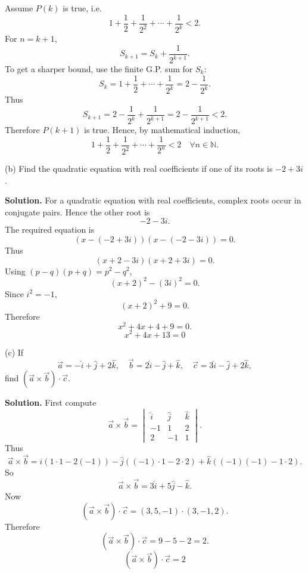 \documentclass[11pt,a4paper]{article}
\newcommand{\question}[1]{\vspace{0.4em}\begin{tcolorbox}[colback=gray!8,colframe=black!55,title=Question,fonttitle=\bfseries]#1\end{tcolorbox}}
\newcommand{\answer}{\textbf{Solution. }}
\newcommand{\final}[1]{\[\boxed{#1}\]}
\newcommand{\N}{\mathbb{N}}
\begin{document}
Assume $P(k)$ is true, i.e.
\[
1+\frac12+\frac1{2^2}+\cdots+\frac1{2^k}<2.
\]
For $n=k+1$,
\[
S_{k+1}=S_k+\frac1{2^{k+1}}.
\]
To get a sharper bound, use the finite G.P. sum for $S_k$:
\[
S_k=1+\frac12+\cdots+\frac1{2^k}=2-\frac1{2^k}.
\]
Thus
\[
S_{k+1}=2-\frac1{2^k}+\frac1{2^{k+1}}
=2-\frac1{2^{k+1}}<2.
\]
Therefore $P(k+1)$ is true. Hence, by mathematical induction,
\[
\boxed{1+\frac12+\frac1{2^2}+\cdots+\frac1{2^n}<2\quad \forall n\in\N.}
\]

\question{(b) Find the quadratic equation with real coefficients if one of its roots is $-2+3i$.}
\answer
For a quadratic equation with real coefficients, complex roots occur in conjugate pairs. Hence the other root is
\[
-2-3i.
\]
The required equation is
\[
(x-(-2+3i))(x-(-2-3i))=0.
\]
Thus
\[
(x+2-3i)(x+2+3i)=0.
\]
Using $(p-q)(p+q)=p^2-q^2$,
\[
(x+2)^2-(3i)^2=0.
\]
Since $i^2=-1$,
\[
(x+2)^2+9=0.
\]
Therefore
\[
x^2+4x+4+9=0.
\]
\final{x^2+4x+13=0}

\question{(c) If
\[
\vec a=-\hat i+\hat j+2\hat k,
\quad
\vec b=2\hat i-\hat j+\hat k,
\quad
\vec c=3\hat i-\hat j+2\hat k,
\]
find $(\vec a\times\vec b)\cdot\vec c$.}
\answer
First compute
\[
\vec a\times\vec b=\begin{vmatrix}
\hat i&\hat j&\hat k\\
-1&1&2\\
2&-1&1
\end{vmatrix}.
\]
Thus
\[
\vec a\times\vec b
=\hat i(1\cdot1-2(-1))-\hat j((-1)\cdot1-2\cdot2)+\hat k((-1)(-1)-1\cdot2).
\]
So
\[
\vec a\times\vec b=3\hat i+5\hat j-\hat k.
\]
Now
\[
(\vec a\times\vec b)\cdot\vec c=(3,5,-1)\cdot(3,-1,2).
\]
Therefore
\[
(\vec a\times\vec b)\cdot\vec c=9-5-2=2.
\]
\final{(\vec a\times\vec b)\cdot\vec c=2}
\end{document}

